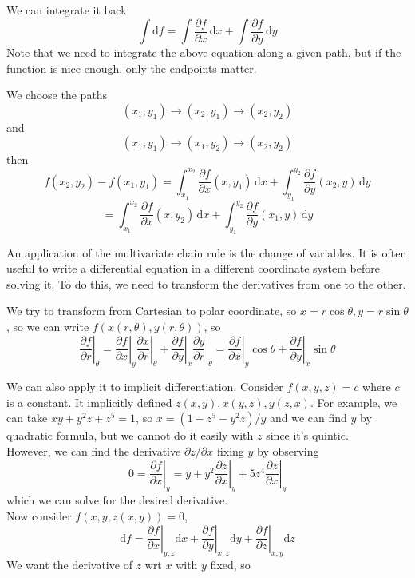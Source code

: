 We can integrate it back
$$\int\mathrm df=\int\frac{\partial f}{\partial x}\,\mathrm dx+\int\frac{\partial f}{\partial y}\,\mathrm dy$$
Note that we need to integrate the above equation along a given path, but if the function is nice enough, only the endpoints matter.
\begin{example}
    We choose the paths
    $$(x_1,y_1)\to(x_2,y_1)\to(x_2,y_2)$$
    and
    $$(x_1,y_1)\to(x_1,y_2)\to(x_2,y_2)$$
    then
    $$f(x_2,y_2)-f(x_1,y_1)=\int_{x_1}^{x_2}\frac{\partial f}{\partial x}(x,y_1)\,\mathrm dx+\int_{y_1}^{y_2}\frac{\partial f}{\partial y}(x_2,y)\,\mathrm dy$$
    $$=\int_{x_1}^{x_2}\frac{\partial f}{\partial x}(x,y_2)\,\mathrm dx+\int_{y_1}^{y_2}\frac{\partial f}{\partial y}(x_1,y)\,\mathrm dy$$
\end{example}
An application of the multivariate chain rule is the change of variables.
It is often useful to write a differential equation in a different coordinate system before solving it.
To do this, we need to transform the derivatives from one to the other.
\begin{example}
    We try to transform from Cartesian to polar coordinate, so $x=r\cos\theta,y=r\sin\theta$, so we can write $f(x(r,\theta),y(r,\theta))$, so
    $$\left.\frac{\partial f}{\partial r}\right|_\theta=\left.\frac{\partial f}{\partial x}\right|_y\left.\frac{\partial x}{\partial r}\right|_\theta+\left.\frac{\partial f}{\partial y}\right|_x\left.\frac{\partial y}{\partial r}\right|_\theta=\left.\frac{\partial f}{\partial x}\right|_y\cos\theta+\left.\frac{\partial f}{\partial y}\right|_x\sin\theta$$
\end{example}
We can also apply it to implicit differentiation.
Consider $f(x,y,z)=c$ where $c$ is a constant.
It implicitly defined $z(x,y),x(y,z),y(z,x)$.
For example, we can take $xy+y^2z+z^5=1$, so $x=(1-z^5-y^2z)/y$ and we can find $y$ by quadratic formula, but we cannot do it easily with $z$ since it's quintic.\\
However, we can find the derivative $\partial z/\partial x$ fixing $y$ by observing
$$0=\left.\frac{\partial f}{\partial x}\right|_y=y+y^2\left.\frac{\partial z}{\partial x}\right|_y+5z^4\left.\frac{\partial z}{\partial x}\right|_y$$
which we can solve for the desired derivative.\\
Now consider $f(x,y,z(x,y))=0$,
$$\mathrm df=\left.\frac{\partial f}{\partial x}\right|_{y,z}\mathrm dx+\left.\frac{\partial f}{\partial y}\right|_{x,z}\mathrm dy+\left.\frac{\partial f}{\partial z}\right|_{x,y}\mathrm dz$$
We want the derivative of $z$ wrt $x$ with $y$ fixed, so
